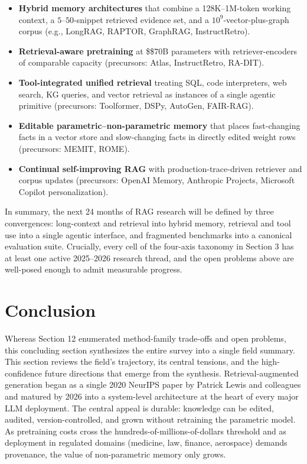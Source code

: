 \begin{itemize}
\tightlist
\item
  \textbf{Hybrid memory architectures} that combine a 128K--1M-token working context, a \(5\)--\(50\)-snippet retrieved evidence set, and a \(10^9\)-vector-plus-graph corpus (e.g., LongRAG, RAPTOR, GraphRAG, InstructRetro).
\item
  \textbf{Retrieval-aware pretraining} at \$\geq\$70B parameters with retriever-encoders of comparable capacity (precursors: Atlas, InstructRetro, RA-DIT).
\item
  \textbf{Tool-integrated unified retrieval} treating SQL, code interpreters, web search, KG queries, and vector retrieval as instances of a single agentic primitive (precursors: Toolformer, DSPy, AutoGen, FAIR-RAG).
\item
  \textbf{Editable parametric--non-parametric memory} that places fast-changing facts in a vector store and slow-changing facts in directly edited weight rows (precursors: MEMIT, ROME).
\item
  \textbf{Continual self-improving RAG} with production-trace-driven retriever and corpus updates (precursors: OpenAI Memory, Anthropic Projects, Microsoft Copilot personalization).
\end{itemize}

In summary, the next 24 months of RAG research will be defined by three convergences: long-context and retrieval into hybrid memory, retrieval and tool use into a single agentic interface, and fragmented benchmarks into a canonical evaluation suite. Crucially, every cell of the four-axis taxonomy in Section 3 has at least one active 2025--2026 research thread, and the open problems above are well-posed enough to admit measurable progress.

\section{Conclusion}\label{conclusion}

Whereas Section 12 enumerated method-family trade-offs and open problems, this concluding section synthesizes the entire survey into a single field summary. This section reviews the field's trajectory, its central tensions, and the high-confidence future directions that emerge from the synthesis. Retrieval-augmented generation began as a single 2020 NeurIPS paper by Patrick Lewis and colleagues and matured by 2026 into a system-level architecture at the heart of every major LLM deployment. The central appeal is durable: knowledge can be edited, audited, version-controlled, and grown without retraining the parametric model. As pretraining costs cross the hundreds-of-millions-of-dollars threshold and as deployment in regulated domains (medicine, law, finance, aerospace) demands provenance, the value of non-parametric memory only grows.

